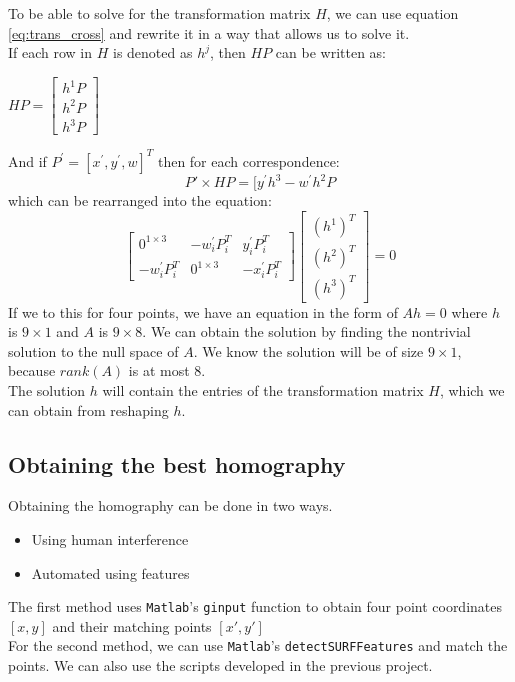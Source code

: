 \documentclass[10pt,twocolumn,letterpaper]{article}
\begin{document}
To be able to solve for the transformation matrix $H$, we can use equation \ref{eq:trans_cross} and rewrite it in a way that allows us to solve it.\\
If each row in $H$ is denoted as $h^{j}$, then $HP$ can be written as:\\
\begin{center}
$
HP =
\begin{bmatrix}
h^{1}P\\
h^{2}P\\
h^{3}P
\end{bmatrix}
$
\end{center}
And if $P^{'} = [x^{'}, y^{'}, w]^{T}$ then for each correspondence:
\begin{equation}
P' \times HP = [y^{'}h^{3} - w^{'}h^{2}P
\end{equation}
which can be rearranged into the equation:
\begin{equation}
\begin{bmatrix}
0^{1\times 3} & -w_{i}^{'}P_{i}^{T} & y_{i}^{'}P_{i}^{T}\\
-w_{i}^{'}P_{i}^{T} & 0^{1 \times 3} & -x_{i}^{'}P_{i}^{T}
\end{bmatrix}
\begin{bmatrix}
(h^{1})^{T}\\
(h^{2})^{T}\\
(h^{3})^{T}
\end{bmatrix}
=0
\end{equation}
If we to this for four points, we have an equation in the form of $Ah=0$ where $h$ is $9 \times 1$ and $A$ is $9\times 8$. We can obtain the solution by finding the nontrivial solution to the null space of $A$. We know the solution will be of size $9\times 1$, because $rank(A)$ is at most 8.\\
The solution $h$ will contain the entries of the transformation matrix $H$, which we can obtain from reshaping $h$.
\subsection{Obtaining the best homography}
Obtaining the homography can be done in two ways.
\begin{itemize}
\item Using human interference
\item Automated using features
\end{itemize}
The first method uses \texttt{Matlab}'s \texttt{ginput} function to obtain four point coordinates $[x,y]$ and their matching points $[x',y']$\\
For the second method, we can use \texttt{Matlab}'s \texttt{detectSURFFeatures} and match the points. We can also use the scripts developed in the previous project.\\
\end{document}
